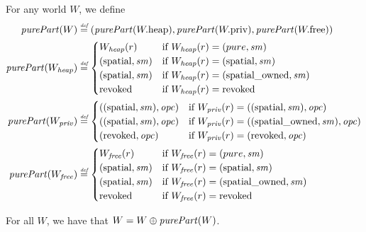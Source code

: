 \documentclass[a4paper]{article}
\begin{document}
\begin{definition}
  For any world $W$, we define
  \begin{align*}
    \purePart{W} &\defeq (\purePart{\pwheap},\purePart{\pwpriv},\purePart{\pwfree})\\
    \purePart{W_\var{heap}} &\defeq
                       \begin{cases}
                         W_{\var{heap}}(r) & \text{if } W_\var{heap}(r) = (pure,\var{sm})\\
                         (\spatial,\var{sm}) & \text{if } W_\var{heap}(r) = (\spatial,\var{sm})\\
                         (\spatial,\var{sm}) & \text{if } W_\var{heap}(r) = (\spatialo,\var{sm})\\
                         \revoked & \text{if } W_\var{heap}(r) = \revoked\\
                       \end{cases}\\
    \purePart{W_\var{priv}} &\defeq
                       \begin{cases}
                         ((\spatial,\var{sm}),\opc) & \text{if } W_\var{priv}(r) = ((\spatial,\var{sm}),\opc)\\
                         ((\spatial,\var{sm}),\opc) & \text{if } W_\var{priv}(r) = ((\spatialo,\var{sm}),\opc)\\
                         (\revoked,\opc) & \text{if } W_\var{priv}(r) = (\revoked,\opc)\\
                       \end{cases}\\
    \purePart{W_\var{free}} &\defeq
                       \begin{cases}
                         W_{\var{free}}(r) & \text{if } W_{\var{free}}(r) = (pure,\var{sm})\\
                         (\spatial,\var{sm}) & \text{if } W_{\var{free}}(r) = (\spatial,\var{sm})\\
                         (\spatial,\var{sm}) & \text{if } W_{\var{free}}(r) = (\spatialo,\var{sm})\\
                         \revoked & \text{if } W_{\var{free}}(r) = \revoked\\
                       \end{cases}
  \end{align*}
\end{definition}

\begin{lemma}
  \label{lem:purePart-duplicable}
 For all $W$, we have that $W = W \oplus \purePart{W}$.
\end{lemma}
\end{document}
